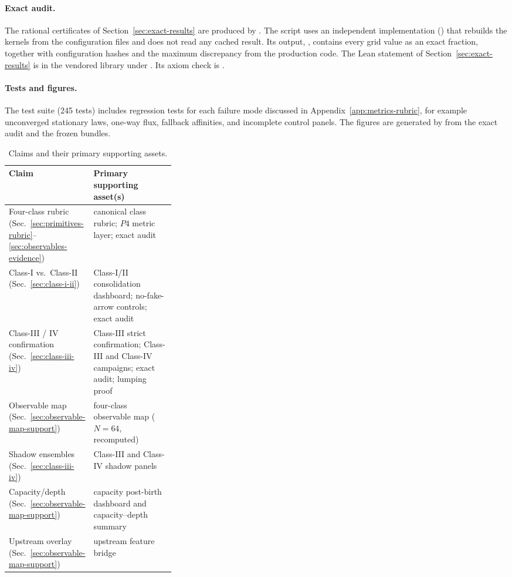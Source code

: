 \paragraph{Exact audit.} The rational certificates of Section~\ref{sec:exact-results} are produced by . The script uses an independent implementation () that rebuilds the kernels from the configuration files and does not read any cached result. Its output, , contains every grid value as an exact fraction, together with configuration hashes and the maximum discrepancy from the production code. The Lean statement of Section~\ref{sec:exact-results} is in the vendored library under . Its axiom check is .

\paragraph{Tests and figures.} The test suite (245 tests) includes regression tests for each failure mode discussed in Appendix~\ref{app:metrics-rubric}, for example unconverged stationary laws, one-way flux, fallback affinities, and incomplete control panels. The figures are generated by  from the exact audit and the frozen bundles.

\begin{table}[tbp]
\centering
\small
\caption{Claims and their primary supporting assets.}
\label{tab:appendix-claim-ledger}
\begin{tabularx}{\linewidth}{@{}L{0.33\linewidth}Y@{}}
\toprule
Claim & Primary supporting asset(s) \\
\midrule
Four-class rubric (Sec.~\ref{sec:primitives-rubric}--\ref{sec:observables-evidence}) & canonical class rubric; $P4$ metric layer; exact audit \\
Class-I vs.\ Class-II (Sec.~\ref{sec:class-i-ii}) & Class-I/II consolidation dashboard; no-fake-arrow controls; exact audit \\
Class-III / IV confirmation (Sec.~\ref{sec:class-iii-iv}) & Class-III strict confirmation; Class-III and Class-IV campaigns; exact audit; lumping proof \\
Observable map (Sec.~\ref{sec:observable-map-support}) & four-class observable map ($N=64$, recomputed) \\
Shadow ensembles (Sec.~\ref{sec:class-iii-iv}) & Class-III and Class-IV shadow panels \\
Capacity/depth (Sec.~\ref{sec:observable-map-support}) & capacity post-birth dashboard and capacity--depth summary \\
Upstream overlay (Sec.~\ref{sec:observable-map-support}) & upstream feature bridge \\
\bottomrule
\end{tabularx}
\end{table}
